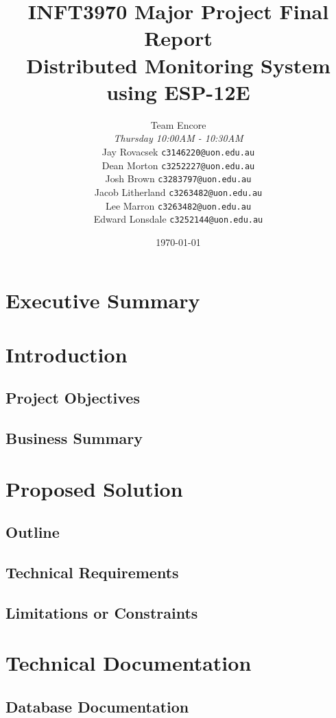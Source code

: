 \documentclass[a4paper,12pt,headings=normal]{article}
\title{INFT3970 Major Project Final Report \protect\\
    Distributed Monitoring System using ESP-12E}
\author{
        Team Encore\\
        \textit{Thursday 10:00AM - 10:30AM}\\
        Jay Rovacsek
        \texttt{c3146220@uon.edu.au}\\
        Dean Morton
        \texttt{c3252227@uon.edu.au}\\
        Josh Brown
        \texttt{c3283797@uon.edu.au}\\
        Jacob Litherland
        \texttt{c3263482@uon.edu.au}\\
        Lee Marron
        \texttt{c3263482@uon.edu.au}\\
        Edward Lonsdale
        \texttt{c3252144@uon.edu.au}
    }
\date{\today}
\begin{document}
    \begin{titlingpage}
        \maketitle
    \end{titlingpage}

    \tableofcontents
    
    \newpage

    \section{Executive Summary}

    \newpage
    \section{Introduction}
        \subsection{Project Objectives}
        \subsection{Business Summary}

    \newpage
    \section{Proposed Solution}
        \subsection{Outline}
        \subsection{Technical Requirements}
        \subsection{Limitations or Constraints}

    \newpage
    \section{Technical Documentation}
        \subsection{Database Documentation}
\end{document}
